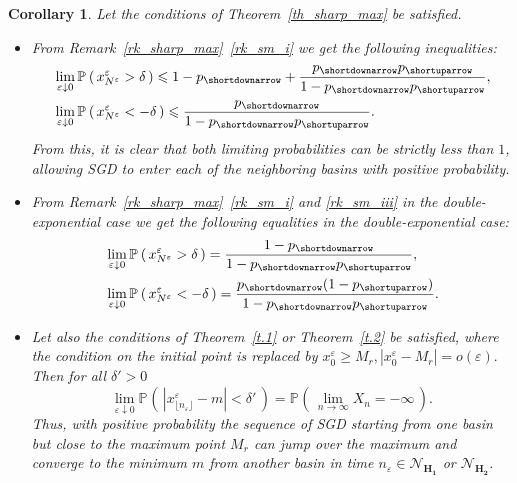 \documentclass{article}
\makeatletter
\theoremstyle{plain}
\newtheorem{corollary}[theorem]{Corollary}
\theoremstyle{definition}
\theoremstyle{remark}
\newcommand{\p}[2][]{{\mathbb{P}}_{#1} \left( \, #2 \, \right) } %
\newcommand{\ra }{ \rightarrow} %
\def\namedlabel#1#2{\begingroup
    #2%
    \def\@currentlabel{#2}%
    \phantomsection\label{#1}\endgroup
}
\makeatother
\begin{document}
\begin{corollary}\label{cl_sharp_max}
Let the conditions of Theorem~\ref{th_sharp_max} be satisfied.
\begin{itemize}
    \item[\namedlabel{cl_sm_i}{$(i)$}] 
From Remark~\ref{rk_sharp_max}~\ref{rk_sm_i} we get the following inequalities: 
\begin{equation*}
\begin{split}
& \lim\limits_{\varepsilon\downarrow 0 } \p{x_{N^{\varepsilon}}^{\varepsilon} > \delta}   \leqslant 1 - p_{\shortdownarrow} +  \frac{p_{\shortdownarrow} p_{\shortuparrow} }{1- p_{\shortdownarrow} p_{\shortuparrow}}, \\ & \lim\limits_{\varepsilon \downarrow 0 }   \p{x_{N^{\varepsilon}}^{\varepsilon} < -\delta}    
 \leqslant \frac{p_{\shortdownarrow} }{1- p_{\shortdownarrow} p_{\shortuparrow}}.
\end{split}
\end{equation*}
From this, it is clear that both limiting probabilities can be strictly less than $1$, allowing SGD to enter each of the neighboring basins with positive probability.

 \item[\namedlabel{cl_sm_i_exp}{$(ii)$}] 
From Remark~\ref{rk_sharp_max}~\ref{rk_sm_i}  and  \ref{rk_sm_iii} in the double-exponential case  we get the following  equalities in the double-exponential case: 
\begin{equation*}
\begin{split}
& \lim\limits_{\varepsilon\downarrow 0 } \p{x_{N^{\varepsilon}}^{\varepsilon} > \delta}   =    \frac{1 - p_{\shortdownarrow} }{1- p_{\shortdownarrow} p_{\shortuparrow}}, \\ 
& \lim\limits_{\varepsilon \downarrow 0 }   \p{x_{N^{\varepsilon}}^{\varepsilon} < -\delta}    
= \frac{p_{\shortdownarrow} (1  -  p_{\shortuparrow} )}{1- p_{\shortdownarrow} p_{\shortuparrow}}.
\end{split}
\end{equation*}


\item[\namedlabel{cl_sm_ii}{$(iii)$}] Let also the conditions of Theorem~\ref{t.1} or Theorem~\ref{t.2} be satisfied, where the condition on the initial point is replaced by $x_0^{\varepsilon} \geq M_r, |x_0^{\varepsilon} - M_r| = o(\varepsilon).$ Then for all $\delta'>0$
\begin{equation}\label{eq_sharp_max_13}
   \lim_{\varepsilon \downarrow 0} \p{ |x_{\lfloor n_\varepsilon \rfloor}^{\varepsilon} - m | < \delta' } =   \p{ \lim\limits_{n \ra \infty} X_n  = - \infty}. 
\end{equation}
Thus, with positive probability the sequence of SGD starting from one basin but close to the maximum point $M_r$ can jump over the maximum and converge to the minimum $m$ from another basin in time $n_{\varepsilon} \in \mathcal{N}_{\mathbf{H_1}} $ or $ \mathcal{N}_{\mathbf{H_2}} $. 
\end{itemize}
\end{corollary}
\end{document}
